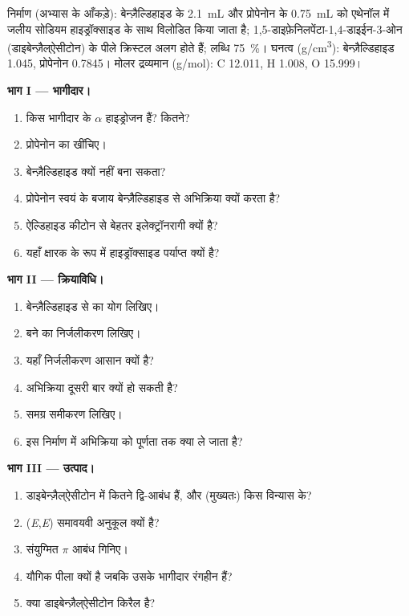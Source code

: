 \begin{problem}
\label{pb:b2:enolates-aldol:1}
निर्माण (अभ्यास के आँकड़े): बेन्ज़ैल्डिहाइड के \qty{2.1}{mL} और प्रोपेनोन के \qty{0.75}{mL} को
एथेनॉल में जलीय सोडियम हाइड्रॉक्साइड के साथ विलोडित किया जाता है; 1,5-डाइफ़ेनिलपेंटा-1,4-डाइईन-3-ओन
(डाइबेन्ज़ैल्ऐसीटोन) के पीले क्रिस्टल अलग होते हैं; लब्धि 75~\%। घनत्व (\unit{g/cm^3}): बेन्ज़ैल्डिहाइड 1.045, प्रोपेनोन 0.7845।
मोलर द्रव्यमान (\unit{g/mol}): C 12.011, H 1.008, O 15.999।

\medskip
\noindent\textbf{भाग I --- भागीदार।}
\begin{enumerate}
  \item किस भागीदार के $\alpha$ हाइड्रोजन हैं? कितने?
  \item प्रोपेनोन का  खींचिए।
  \item बेन्ज़ैल्डिहाइड  क्यों नहीं बना सकता?
  \item प्रोपेनोन स्वयं के बजाय बेन्ज़ैल्डिहाइड से अभिक्रिया क्यों करता है?
  \item ऐल्डिहाइड कीटोन से बेहतर इलेक्ट्रॉनरागी क्यों है?
  \item यहाँ क्षारक के रूप में हाइड्रॉक्साइड पर्याप्त क्यों है?
\end{enumerate}

\medskip
\noindent\textbf{भाग II --- क्रियाविधि।}
\begin{enumerate}[resume]
  \item बेन्ज़ैल्डिहाइड से  का योग लिखिए।
  \item बने  का निर्जलीकरण लिखिए।
  \item यहाँ निर्जलीकरण आसान क्यों है?
  \item अभिक्रिया दूसरी बार क्यों हो सकती है?
  \item समग्र समीकरण लिखिए।
  \item इस निर्माण में अभिक्रिया को पूर्णता तक क्या ले जाता है?
\end{enumerate}

\medskip
\noindent\textbf{भाग III --- उत्पाद।}
\begin{enumerate}[resume]
  \item डाइबेन्ज़ैल्ऐसीटोन में कितने  द्वि-आबंध हैं, और (मुख्यतः) किस विन्यास के?
  \item (\textit{E},\textit{E}) समावयवी अनुकूल क्यों है?
  \item संयुग्मित $\pi$ आबंध गिनिए।
  \item यौगिक पीला क्यों है जबकि उसके भागीदार रंगहीन हैं?
  \item क्या डाइबेन्ज़ैल्ऐसीटोन किरैल है?
\end{enumerate}


\end{problem}
